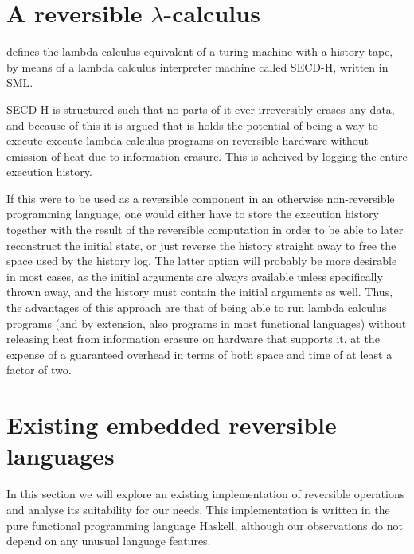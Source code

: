 \documentclass[10pt]{sigplanconf}
\begin{document}


\section{A reversible $\lambda$-calculus}
\cite{huelsbergen1996logically} defines the lambda calculus equivalent of a
turing machine with a history tape, by means of a lambda calculus interpreter
machine called SECD-H, written in SML.

SECD-H is structured such that no parts of it ever irreversibly erases any
data, and because of this it is argued that is holds the potential of being a
way to execute execute lambda calculus programs on reversible hardware without
emission of heat due to information erasure.
This is acheived by logging the entire execution history.

If this were to be used as a reversible component in an otherwise
non-reversible programming language, one would either have to store the
execution history together with the result of the reversible computation in
order to be able to later reconstruct the initial state, or just reverse the
history straight away to free the space used by the history log. The latter
option will probably be more desirable in most cases, as the initial arguments
are always available unless specifically thrown away, and the history must
contain the initial arguments as well. Thus, the advantages of this approach
are that of being able to run lambda calculus programs (and by extension, also
programs in most functional languages) without releasing heat from information
erasure on hardware that supports it, at the expense of a guaranteed overhead
in terms of both space and time of at least a factor of two.

\section{Existing embedded reversible languages}

In this section we will explore an existing implementation of
reversible operations and analyse its suitability for our needs.  This
implementation is written in the pure functional programming language
Haskell, although our observations do not depend on any unusual
language features.
\end{document}
